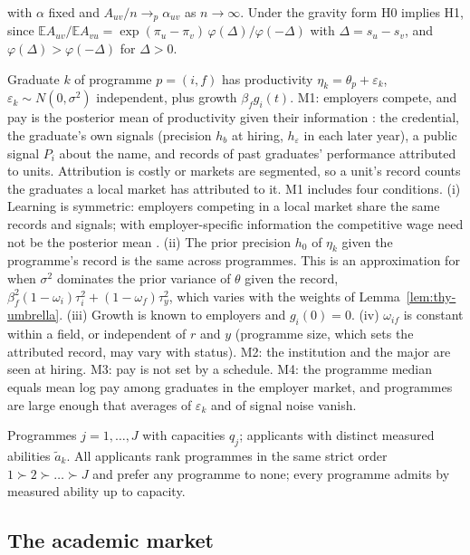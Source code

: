 \begin{description}
with $\alpha$ fixed and $A_{uv}/n\to_p\alpha_{uv}$ as $n\to\infty$. Under the gravity form H0 implies H1, since
$\mathbb EA_{uv}/\mathbb EA_{vu}=\exp(\pi_u-\pi_v)\,\varphi(\Delta)/\varphi(-\Delta)$ with $\Delta=s_u-s_v$, and
$\varphi(\Delta)>\varphi(-\Delta)$ for $\Delta>0$.
\item[M1--M4 (graduate market).] Graduate $k$ of programme $p=(i,f)$ has productivity $\eta_k=\theta_p+\varepsilon_k$,
$\varepsilon_k\sim N(0,\sigma^2)$ independent, plus growth $\beta_fg_i(t)$. M1: employers compete, and pay is the
posterior mean of productivity given their information \citep{farber1996learning}: the credential, the graduate's
own signals (precision $h_b$ at hiring, $h_\varepsilon$ in each later year), a public signal $P_i$ about the name,
and records of past graduates' performance attributed to units. Attribution is costly or markets are segmented, so a
unit's record counts the graduates a local market has attributed to it. M1 includes four conditions. (i) Learning
is symmetric: employers competing in a local market share the same records and signals; with employer-specific
information the competitive wage need not be the posterior mean
\citep{waldman1984job,greenwald1986adverse,schonberg2007testing,kahn2013asymmetric}. (ii) The prior precision $h_0$
of $\eta_k$ given the programme's record is the same across programmes. This is an approximation for when $\sigma^2$
dominates the prior variance of $\theta$ given the record, $\beta_f^2(1-\omega_i)\tau_i^2+(1-\omega_f)\tau_y^2$,
which varies with the weights of Lemma~\ref{lem:thy-umbrella}. (iii) Growth is known to employers and $g_i(0)=0$.
(iv) $\omega_{if}$ is constant within a field, or independent of $r$ and $y$ (programme size, which sets the
attributed record, may vary with status). M2: the institution and the major are seen at hiring. M3: pay is not set
by a schedule. M4: the programme median equals mean log pay among graduates in the employer market, and programmes
are large enough that averages of $\varepsilon_k$ and of signal noise vanish.
\item[S1 (students).] Programmes $j=1,\dots,J$ with capacities $q_j$; applicants with distinct measured abilities
$\tilde a_k$. All applicants rank programmes in the same strict order $1\succ2\succ\dots\succ J$ and prefer any
programme to none; every programme admits by measured ability up to capacity.
\end{description}

\subsection{The academic market}\label{app:thy:academy}

